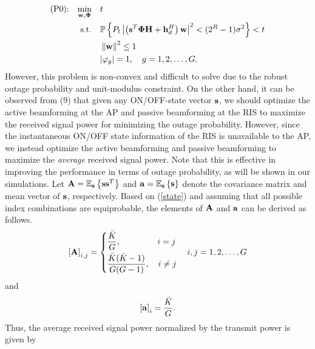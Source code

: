 \documentclass[draftclsnofoot,onecolumn,12pt]{IEEEtran}
\begin{document}
	\begin{align}
	\text{(P0):} \quad \underset{{\bf w},{\bm \Phi}}{\min}
	& \quad  t\\
	 \text{s.t.} & \quad \mathbb{P} \left\{ {P_t}
	\left|\left({\bf s}^T {\bm \Phi} {{\bf H}} + {{\bf h}}_d^H\right) {\bf w}\right|^2 < (2^R -1){\sigma^2}\right\}<t \\
	& \quad \left\| {\bf w}\right\|^2 \le 1 \\
	& \quad |\varphi_{g}|=1, \quad g=1,2,\ldots,G  .
	\end{align}
	However, this problem is non-convex and difficult to solve due to the robust outage probability and unit-modulus constraint. 
	On the other hand, it can be observed from (9) that given any ON/OFF-state vector $\bf s$, we should optimize the active beamforming at the AP and passive beamforming at the RIS to maximize the received signal power for minimizing the outage probability. 
	However, since the instantaneous ON/OFF state information of the RIS is unavailable to the AP, we instead optimize the active beamforming and passive beamforming to maximize the
	{\it average} received signal power. Note that this is effective in improving the performance in terms of outage probability, as will be shown in our simulations. 
Let ${\bf A}=\mathbb{E}_{\bf s}\left\{{\bf s} {\bf s}^T\right\}$ and ${\bf a}=\mathbb{E}_{\bf s}\left\{{\bf s} \right\}$  denote the covariance matrix and mean vector of $\bf s$, respectively. 
Based on (\ref{state}) and  assuming that all possible index combinations are equiprobable, the elements of ${\bf A}$ and ${\bf a}$ can be derived as follows.
\begin{align}
\left[{\bf A}\right]_{i,j}=\left\{ \begin{gathered}
\frac{\bar K}{G},\qquad\qquad~ i=j \hfill \\
\frac{{\bar K}({\bar K}-1)}{G({G}-1)},\quad i \neq j \hfill
\end{gathered}  \right. \quad i,j = 1, 2,\ldots,G
\end{align} 
and 
\begin{align}
\left[{\bf a}\right]_{i}=\frac{\bar K}{G}.
\end{align}
Thus, the average received signal power normalized by the transmit power is given by 
\end{document}
